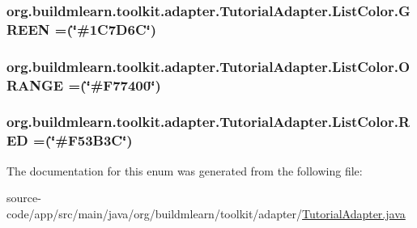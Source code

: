 \subsubsection[{\texorpdfstring{G\+R\+E\+EN}{GREEN}}]{\setlength{\rightskip}{0pt plus 5cm}org.\+buildmlearn.\+toolkit.\+adapter.\+Tutorial\+Adapter.\+List\+Color.\+G\+R\+E\+EN =(\char`\"{}\#1\+C7\+D6\+C\char`\"{})}\hypertarget{enumorg_1_1buildmlearn_1_1toolkit_1_1adapter_1_1TutorialAdapter_1_1ListColor_a567997e55f26dd5faf98d7030e6e75a9}{}\label{enumorg_1_1buildmlearn_1_1toolkit_1_1adapter_1_1TutorialAdapter_1_1ListColor_a567997e55f26dd5faf98d7030e6e75a9}
\subsubsection[{\texorpdfstring{O\+R\+A\+N\+GE}{ORANGE}}]{\setlength{\rightskip}{0pt plus 5cm}org.\+buildmlearn.\+toolkit.\+adapter.\+Tutorial\+Adapter.\+List\+Color.\+O\+R\+A\+N\+GE =(\char`\"{}\#F77400\char`\"{})}\hypertarget{enumorg_1_1buildmlearn_1_1toolkit_1_1adapter_1_1TutorialAdapter_1_1ListColor_a17c335d0ac279da5031a40c052339a65}{}\label{enumorg_1_1buildmlearn_1_1toolkit_1_1adapter_1_1TutorialAdapter_1_1ListColor_a17c335d0ac279da5031a40c052339a65}
\subsubsection[{\texorpdfstring{R\+ED}{RED}}]{\setlength{\rightskip}{0pt plus 5cm}org.\+buildmlearn.\+toolkit.\+adapter.\+Tutorial\+Adapter.\+List\+Color.\+R\+ED =(\char`\"{}\#F53\+B3C\char`\"{})}\hypertarget{enumorg_1_1buildmlearn_1_1toolkit_1_1adapter_1_1TutorialAdapter_1_1ListColor_a511d8098c47f1445e66c286bf3528f33}{}\label{enumorg_1_1buildmlearn_1_1toolkit_1_1adapter_1_1TutorialAdapter_1_1ListColor_a511d8098c47f1445e66c286bf3528f33}


The documentation for this enum was generated from the following file\+:\begin{DoxyCompactItemize}
\item 
source-\/code/app/src/main/java/org/buildmlearn/toolkit/adapter/\hyperlink{TutorialAdapter_8java}{Tutorial\+Adapter.\+java}\end{DoxyCompactItemize}
